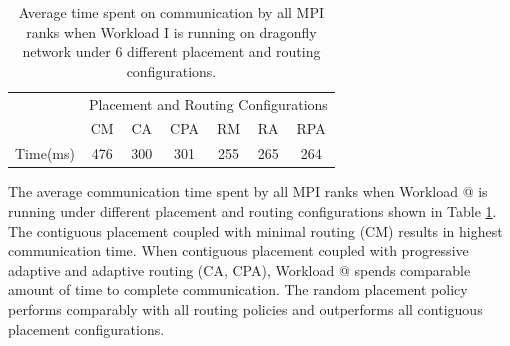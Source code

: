 \documentclass[conference,compsoc]{IEEEtran}
\makeatletter
\newcommand{\Rmnum}[1]{\expandafter\@slowromancap\romannumeral #1@}
\makeatother
\begin{document}
\begin{table}[ht]
\begin{center}
\caption{Average time spent on communication by all MPI ranks when Workload I is running on dragonfly network under 6 different placement and routing configurations.} 
\label{tab:wkld-commtime}
\begin{tabular}{l c c c c c c }
\toprule %
\toprule
&\multicolumn{6}{c}{Placement and Routing Configurations} \\ %
\cmidrule(l){2-7}
	      & CM & CA & CPA & RM & RA & RPA \\ %
\midrule %
Time(ms)  & 476  & 300  & 301  & 255  & 265  & 264  \\ %

\midrule %
\bottomrule %
\end{tabular}
\end{center}
\end{table}

The average communication time spent by all MPI ranks when Workload \Rmnum{1} is running under different placement and routing configurations shown in Table \ref{tab:wkld-commtime}. The contiguous placement coupled with minimal routing (CM) results in highest communication time. When contiguous placement coupled with progressive adaptive and adaptive routing (CA, CPA), Workload \Rmnum{1} spends comparable amount of time to complete communication. The random placement policy performs comparably with all routing policies and outperforms all contiguous placement configurations.
\end{document}
